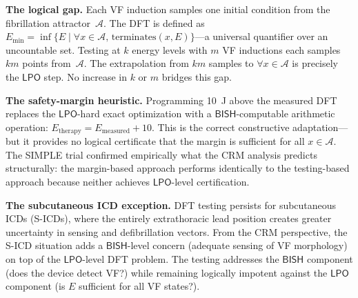\documentclass[11pt,a4paper]{article}
\theoremstyle{plain}
\theoremstyle{definition}
\newcommand{\BISH}{\textsf{BISH}}
\newcommand{\LPO}{\textsf{LPO}}
\begin{document}
\textbf{The logical gap.}  Each VF induction samples one initial condition from the fibrillation attractor~$\mathcal{A}$.  The DFT is defined as $E_{\min} = \inf\{E \mid \forall x \in \mathcal{A},\, \mathrm{terminates}(x,E)\}$---a universal quantifier over an uncountable set.  Testing at $k$ energy levels with $m$ VF inductions each samples $km$ points from~$\mathcal{A}$.  The extrapolation from $km$ samples to $\forall x \in \mathcal{A}$ is precisely the $\LPO$ step.  No increase in $k$ or $m$ bridges this gap.

\textbf{The safety-margin heuristic.}  Programming 10~J above the measured DFT replaces the $\LPO$-hard exact optimization with a $\BISH$-computable arithmetic operation: $E_{\mathrm{therapy}} = E_{\mathrm{measured}} + 10$.  This is the correct constructive adaptation---but it provides no logical certificate that the margin is sufficient for all $x \in \mathcal{A}$.  The SIMPLE trial confirmed empirically what the CRM analysis predicts structurally: the margin-based approach performs identically to the testing-based approach because neither achieves $\LPO$-level certification.

\textbf{The subcutaneous ICD exception.}  DFT testing persists for subcutaneous ICDs (S-ICDs), where the entirely extrathoracic lead position creates greater uncertainty in sensing and defibrillation vectors.  From the CRM perspective, the S-ICD situation adds a $\BISH$-level concern (adequate sensing of VF morphology) on top of the $\LPO$-level DFT problem.  The testing addresses the $\BISH$ component (does the device detect VF?) while remaining logically impotent against the $\LPO$ component (is $E$ sufficient for all VF states?).
\end{document}

